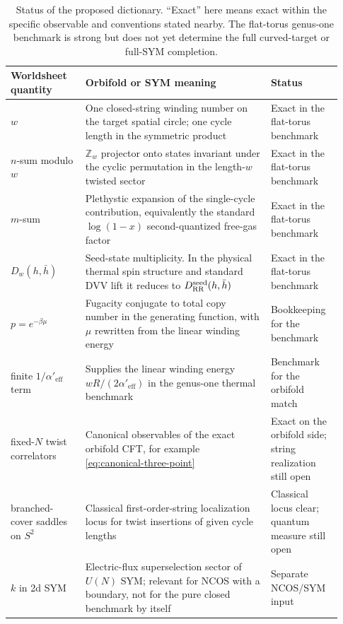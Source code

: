 \documentclass[11pt]{article}
\newcommand{\Aeff}{\alpha'_{\mathrm{eff}}}
\begin{document}
\begin{table}[ht]
\centering
\renewcommand{\arraystretch}{1.2}
\begin{tabular}{>{\raggedright\arraybackslash}p{0.21\linewidth} >{\raggedright\arraybackslash}p{0.52\linewidth} >{\raggedright\arraybackslash}p{0.20\linewidth}}
\toprule
Worldsheet quantity & Orbifold or SYM meaning & Status \\
\midrule
$w$ & One closed-string winding number on the target spatial circle; one cycle length in the symmetric product & Exact in the flat-torus benchmark \\
$n$-sum modulo $w$ & $\mathbb Z_w$ projector onto states invariant under the cyclic permutation in the length-$w$ twisted sector & Exact in the flat-torus benchmark \\
$m$-sum & Plethystic expansion of the single-cycle contribution, equivalently the standard $\log(1-x)$ second-quantized free-gas factor & Exact in the flat-torus benchmark \\
$D_w(h,\bar h)$ & Seed-state multiplicity. In the physical thermal spin structure and standard DVV lift it reduces to $D_{\rm RR}^{\mathrm{seed}}(h,\bar h)$ & Exact in the flat-torus benchmark \\
$p=e^{-\beta\mu}$ & Fugacity conjugate to total copy number in the generating function, with $\mu$ rewritten from the linear winding energy & Bookkeeping for the benchmark \\
finite $1/\Aeff$ term & Supplies the linear winding energy $wR/(2\Aeff)$ in the genus-one thermal benchmark & Benchmark for the orbifold match \\
fixed-$N$ twist correlators & Canonical observables of the exact orbifold CFT, for example \eqref{eq:canonical-three-point} & Exact on the orbifold side; string realization still open \\
branched-cover saddles on $S^2$ & Classical first-order-string localization locus for twist insertions of given cycle lengths & Classical locus clear; quantum measure still open \\
$k$ in 2d SYM & Electric-flux superselection sector of $U(N)$ SYM; relevant for NCOS with a boundary, not for the pure closed benchmark by itself & Separate NCOS/SYM input \\
\bottomrule
\end{tabular}
\caption{Status of the proposed dictionary. ``Exact'' here means exact within the specific observable and conventions stated nearby. The flat-torus genus-one benchmark is strong but does not yet determine the full curved-target or full-SYM completion.}
\label{tab:dictionary}
\end{table}
\end{document}
